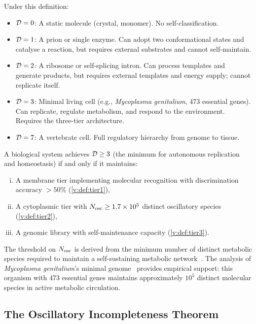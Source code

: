 Under this definition:
\begin{itemize}
  \item $\mathcal{D} = 0$: A static molecule (crystal, monomer). No self-classification.
  \item $\mathcal{D} = 1$: A prion or single enzyme. Can adopt two conformational states and catalyse a reaction, but requires external substrates and cannot self-maintain.
  \item $\mathcal{D} = 2$: A ribosome or self-splicing intron. Can process templates and generate products, but requires external templates and energy supply; cannot replicate itself.
  \item $\mathcal{D} = 3$: Minimal living cell (e.g., \textit{Mycoplasma genitalium}, 473 essential genes). Can replicate, regulate metabolism, and respond to the environment. Requires the three-tier architecture.
  \item $\mathcal{D} = 7$: A vertebrate cell. Full regulatory hierarchy from genome to tissue.
\end{itemize}

\begin{theorem}
\label{v:thm:life_threshold}
A biological system achieves $\mathcal{D} \geq 3$ (the minimum for autonomous replication and homeostasis) if and only if it maintains:
\begin{enumerate}[(i)]
  \item A membrane tier implementing molecular recognition with discrimination accuracy $>50\%$ (\cref{v:def:tier1}),
  \item A cytoplasmic tier with $N_{\mathrm{osc}} \geq 1.7 \times 10^5$ distinct oscillatory species (\cref{v:def:tier2}),
  \item A genomic library with self-maintenance capacity (\cref{v:def:tier3}).
\end{enumerate}
\end{theorem}

The threshold on $N_{\mathrm{osc}}$ is derived from the minimum number of distinct metabolic species required to maintain a self-sustaining metabolic network~\cite{Kauffman1986}. The analysis of \textit{Mycoplasma genitalium}'s minimal genome~\cite{Glass2006} provides empirical support: this organism with 473 essential genes maintains approximately $10^5$ distinct molecular species in active metabolic circulation.

\subsection{The Oscillatory Incompleteness Theorem}

